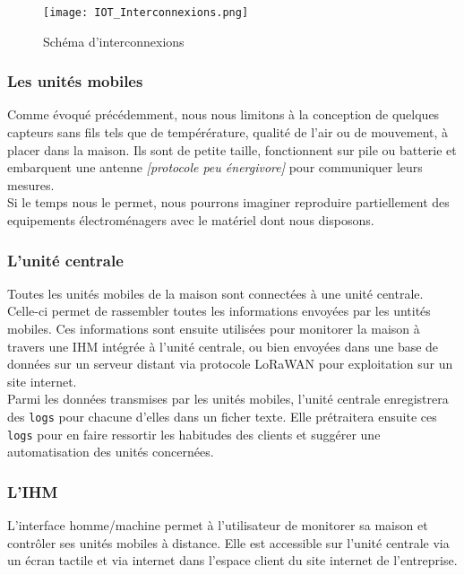 \documentclass[11pt]{scrartcl} %
\begin{document}
\begin{figure}[h] %
	\centering
	\texttt{[image: IOT\_Interconnexions.png]} %
	\caption{Schéma d'interconnexions}
\end{figure}


\subsubsection{Les unités mobiles}

Comme évoqué précédemment, nous nous limitons à la conception de quelques capteurs sans fils tels que de tempérérature, qualité de l'air ou de mouvement, à placer dans la maison. Ils sont de petite taille, fonctionnent sur pile ou batterie et embarquent une antenne \textit{[protocole peu énergivore]} pour communiquer leurs mesures.\\
Si le temps nous le permet, nous pourrons imaginer reproduire partiellement des equipements électroménagers avec le matériel dont nous disposons.

\subsubsection{L'unité centrale}

Toutes les unités mobiles de la maison sont connectées à une unité centrale. Celle-ci permet de rassembler toutes les informations envoyées par les untités mobiles. Ces informations sont ensuite utilisées pour monitorer la maison à travers une IHM intégrée à l'unité centrale, ou bien envoyées dans une base de données sur un serveur distant via protocole LoRaWAN pour exploitation sur un 
site internet.\\
Parmi les données transmises par les unités mobiles, l'unité centrale enregistrera des \texttt{logs} pour chacune d'elles dans un ficher texte. Elle prétraitera ensuite ces \texttt{logs} pour en faire ressortir les habitudes des clients et suggérer une automatisation des unités concernées.

\subsubsection{L'IHM}

L'interface homme/machine permet à l'utilisateur de monitorer sa maison et contrôler ses unités mobiles à distance. Elle est accessible sur l'unité centrale via un écran tactile et via internet dans l'espace client du site internet de l'entreprise.
\end{document}
